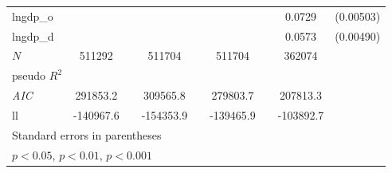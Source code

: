{\begin{tabular}{l*{4}{cc}}
lngdp\_o   &                  &         &                  &         &                  &         &   0.0729\sym{***}&(0.00503)\\
lngdp\_d   &                  &         &                  &         &                  &         &   0.0573\sym{***}&(0.00490)\\
\hline
\(N\)     &   511292         &         &   511704         &         &   511704         &         &   362074         &         \\
pseudo \(R^{2}\)&                  &         &                  &         &                  &         &                  &         \\
\textit{AIC}& 291853.2         &         & 309565.8         &         & 279803.7         &         & 207813.3         &         \\
ll        &-140967.6         &         &-154353.9         &         &-139465.9         &         &-103892.7         &         \\
\hline\hline
\multicolumn{9}{l}{\footnotesize Standard errors in parentheses}\\
\multicolumn{9}{l}{\footnotesize \sym{*} \(p<0.05\), \sym{**} \(p<0.01\), \sym{***} \(p<0.001\)}\\
\end{tabular}
}
